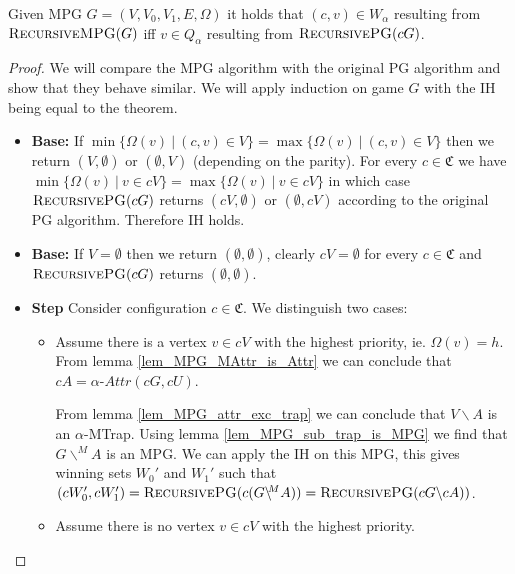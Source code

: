 \begin{theorem}
	Given MPG $G = (V,V_0,V_1,E,\Omega)$ it holds that $(c,v) \in W_\alpha$ resulting from $\textsc{RecursiveMPG}(G)$ iff $v \in Q_\alpha$ resulting from $\textsc{RecursivePG}(cG)$.
		\begin{proof}
			We will compare the MPG algorithm with the original PG algorithm and show that they behave similar. We will apply induction on game $G$ with the IH being equal to the theorem.
			\begin{itemize}
				\item \textbf{Base:} If $\min\{\Omega(v)\ |\ (c,v) \in V \} = \max\{\Omega(v)\ |\ (c,v) \in V \}$ then we return $(V,\emptyset)$ or $(\emptyset, V)$ (depending on the parity). For every $c \in \mathfrak{C}$ we have $\min\{\Omega(v)\ |\ v \in cV \} = \max\{\Omega(v)\ |\ v \in cV \}$ in which case $\textsc{RecursivePG}(cG)$ returns $(cV,\emptyset)$ or $(\emptyset,cV)$ according to the original PG algorithm. Therefore IH holds.
				\item \textbf{Base:} If $V = \emptyset$ then we return $(\emptyset, \emptyset)$, clearly $cV = \emptyset$ for every $c \in \mathfrak{C}$ and $\textsc{RecursivePG}(cG)$ returns $(\emptyset, \emptyset)$.
				\item \textbf{Step} Consider configuration $c \in \mathfrak{C}$. We distinguish two cases:
				\begin{itemize}
					\item Assume there is a vertex $v \in cV$ with the highest priority, ie. $\Omega(v) = h$.
					From lemma \ref{lem_MPG_MAttr_is_Attr} we can conclude that $cA = \alpha\textit{-Attr}(cG,cU)$.
					
					From lemma \ref{lem_MPG_attr_exc_trap} we can conclude that $V\backslash A$ is an $\alpha$-MTrap. Using lemma \ref{lem_MPG_sub_trap_is_MPG} we find that $G\backslash^{\!\!M}A$ is an MPG. We can apply the IH on this MPG, this gives winning sets $W_0'$ and $W_1'$ such that $(cW_0',cW_1') = \textsc{RecursivePG}(c(G\backslash^{\!\!M}A)) = \textsc{RecursivePG}(cG\backslash cA))$.
					
					
					\item Assume there is no vertex $v \in cV$ with the highest priority. 
				\end{itemize}
			\end{itemize}
		\end{proof}
\end{theorem}